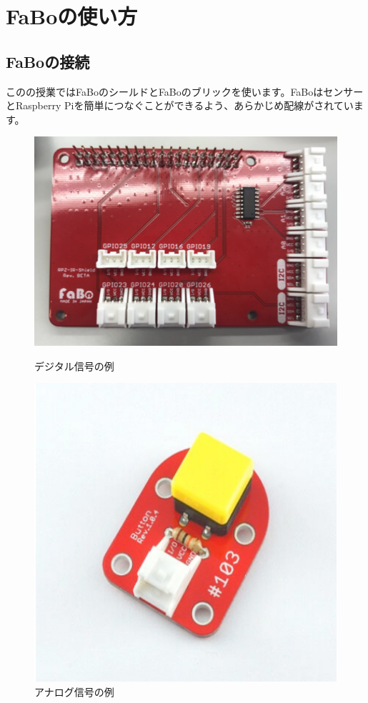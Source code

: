 \section{FaBoの使い方}
\subsection{FaBoの接続}
このの授業ではFaBoのシールドとFaBoのブリックを使います。FaBoはセンサーとRaspberry Piを簡単につなぐことができるよう、あらかじめ配線がされています。

\begin{figure}[htbp]
  \begin{minipage}[b]{0.45\linewidth}
    \centering
    \includegraphics[keepaspectratio, scale=0.6]{images/chap05/text05-img004.png}
    \caption{デジタル信号の例}
    \label{fig4}
  \end{minipage}
  \begin{minipage}[b]{0.45\linewidth}
    \centering
    \includegraphics[keepaspectratio, scale=0.6]{images/chap05/text05-img005.png}
    \caption{アナログ信号の例}
    \label{fig5}
  \end{minipage}
\end{figure}

